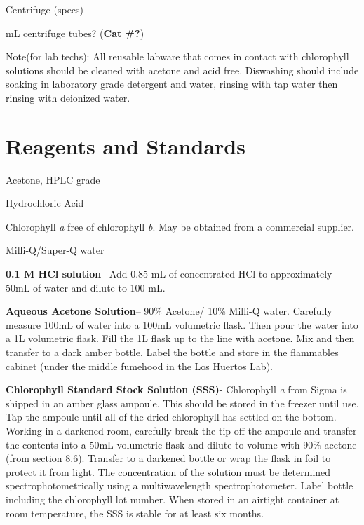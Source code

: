 \documentclass[12pt]{../SOP2}
\begin{document}
\NP Centrifuge (specs)

 mL centrifuge tubes? (\textbf{Cat \#?})%


\NP Note(for lab techs): All reusable labware that comes in contact with chlorophyll solutions should be cleaned with acetone and acid free. Diswashing should include soaking in laboratory grade detergent and water, rinsing with tap water then rinsing with deionized water. 

\section{Reagents and Standards}
\NP Acetone, HPLC grade

\NP Hydrochloric Acid

\NP Chlorophyll \textit{a} free of chlorophyll \textit{b}. May be obtained from a commercial supplier.

\NP Milli-Q/Super-Q water

\NP \textbf{0.1 M HCl solution}-- Add 0.85 mL of concentrated HCl to approximately 50mL of water and dilute to 100 mL. 

\NP \textbf{Aqueous Acetone Solution}-- 90\% Acetone/ 10\% Milli-Q water. Carefully measure 100mL of water into a 100mL volumetric flask. Then pour the water into a 1L volumetric flask. Fill the 1L flask up to the line with acetone. Mix and then transfer to a dark amber bottle. Label the bottle and store in the flammables cabinet (under the middle fumehood in the Los Huertos Lab). 

\NP \textbf{Chlorophyll Standard Stock Solution (SSS)}- Chlorophyll \textit{a} from Sigma is shipped in an amber glass ampoule. This should be stored in the freezer until use. Tap the ampoule until all of the dried chlorophyll has settled on the bottom. Working in a darkened room, carefully break the tip off the ampoule and transfer the contents into a 50mL volumetric flask and dilute to volume with 90\% acetone (from section 8.6). Transfer to a darkened bottle or wrap the flask in foil to protect it from light. The concentration of the solution must be determined spectrophotometrically using a multiwavelength spectrophotometer. Label bottle including the chlorophyll lot number. When stored in an airtight container at room temperature, the SSS is stable for at least six months.
\end{document}
